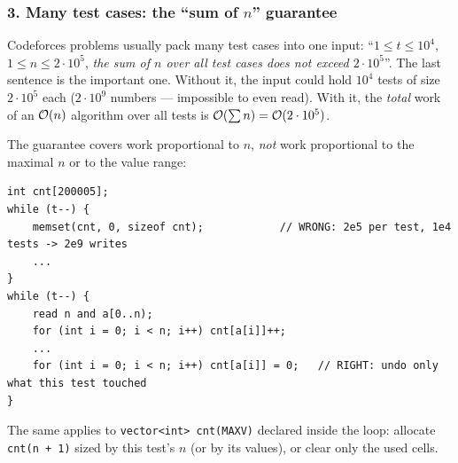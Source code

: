 \subsubsection*{3. Many test cases: the ``sum of $n$'' guarantee}

Codeforces problems usually pack many test cases into one input: ``$1 \le t \le 10^4$, $1 \le n \le 2\cdot10^5$, \emph{the sum of $n$ over all test cases does not exceed $2\cdot10^5$}''. The last sentence is the important one. Without it, the input could hold $10^4$ tests of size $2\cdot10^5$ each ($2\cdot10^9$ numbers --- impossible to even read). With it, the \emph{total} work of an $\mathcal{O}(n)$ algorithm over all tests is $\mathcal{O}(\sum n) = \mathcal{O}(2\cdot10^5)$.

\begin{diagrambox}
\end{diagrambox}

The guarantee covers work proportional to $n$, \emph{not} work proportional to the maximal $n$ or to the value range:

\begin{warningbox}
\begin{lstlisting}[style=snippet]
int cnt[200005];
while (t--) {
    memset(cnt, 0, sizeof cnt);            // WRONG: 2e5 per test, 1e4 tests -> 2e9 writes
    ...
}
while (t--) {
    read n and a[0..n);
    for (int i = 0; i < n; i++) cnt[a[i]]++;
    ...
    for (int i = 0; i < n; i++) cnt[a[i]] = 0;   // RIGHT: undo only what this test touched
}
\end{lstlisting}
The same applies to \texttt{vector<int> cnt(MAXV)} declared inside the loop: allocate \texttt{cnt(n + 1)} sized by this test's $n$ (or by its values), or clear only the used cells.
\end{warningbox}


